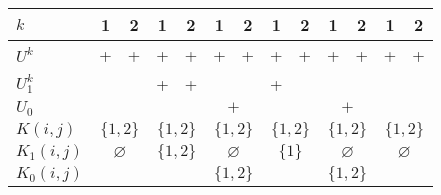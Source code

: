 \documentclass{article}
\begin{document}
\begin{center}
\begin{tabular}{|l||c|c||c|c||c|c||c|c||c|c||c|c|}
$k$&1&2&1&2&1&2&1&2&1&2&1&2\\\hline
\hline$U^k$&+&+&+&+&+&+&+&+&+&+&+&+\\\hline
$U_1^k$&&&+&+&&&+&&&&&\\\hline
$U_0$   &   \multicolumn{2}{|c||}{$$}   &   \multicolumn{2}{|c||}{$$}   &   \multicolumn{2}{|c||}{$+$}  &   \multicolumn{2}{|c||}{$$}   &   \multicolumn{2}{|c||}{$+$}  &   \multicolumn{2}{|c|}{$$}\\\hline
\hline$K(i,j)$  &   \multicolumn{2}{|c||}{$\{1,2\}$}    &   \multicolumn{2}{|c||}{$\{1,2\}$}    &   \multicolumn{2}{|c||}{$\{1,2\}$}    &   \multicolumn{2}{|c||}{$\{1,2\}$}    &   \multicolumn{2}{|c||}{$\{1,2\}$}    &   \multicolumn{2}{|c|}{$\{1,2\}$}\\\hline
$K_1(i,j)$  &   \multicolumn{2}{|c||}{$\varnothing$}    &   \multicolumn{2}{|c||}{$\{1,2\}$}    &   \multicolumn{2}{|c||}{$\varnothing$}    &   \multicolumn{2}{|c||}{$\{1\}$}  &   \multicolumn{2}{|c||}{$\varnothing$}    &   \multicolumn{2}{|c|}{$\varnothing$}\\\hline
$K_0(i,j)$  &   \multicolumn{2}{|c||}{$$}   &   \multicolumn{2}{|c||}{$$}   &   \multicolumn{2}{|c||}{$\{1,2\}$}    &   \multicolumn{2}{|c||}{$$}   &   \multicolumn{2}{|c||}{$\{1,2\}$}    &   \multicolumn{2}{|c|}{$$}\\\hline
\end{tabular}
\\\bigskip
\end{center}
\end{document}
